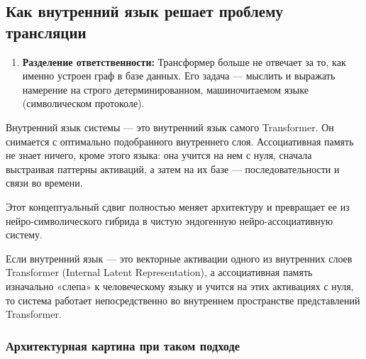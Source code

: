 \documentclass[11pt,a4paper]{article}
\begin{document}
\subsection*{Как внутренний язык решает проблему трансляции}

\begin{enumerate}
    \item \textbf{Разделение ответственности:} Трансформер больше не отвечает за то, как именно устроен граф в базе данных. Его задача — мыслить и выражать намерение на строго детерминированном, машиночитаемом языке (символическом протоколе).
\end{enumerate}

Внутренний язык системы — это внутренний язык самого Transformer. Он снимается с оптимально подобранного внутреннего слоя. Ассоциативная память не знает ничего, кроме этого языка: она учится на нем с нуля, сначала выстраивая паттерны активаций, а затем на их базе — последовательности и связи во времени.

Этот концептуальный сдвиг полностью меняет архитектуру и превращает ее из нейро-символического гибрида в чистую эндогенную нейро-ассоциативную систему.

Если внутренний язык — это векторные активации одного из внутренних слоев Transformer (Internal Latent Representation), а ассоциативная память изначально «слепа» к человеческому языку и учится на этих активациях с нуля, то система работает непосредственно во внутреннем пространстве представлений Transformer.

\subsubsection*{Архитектурная картина при таком подходе}
\end{document}
